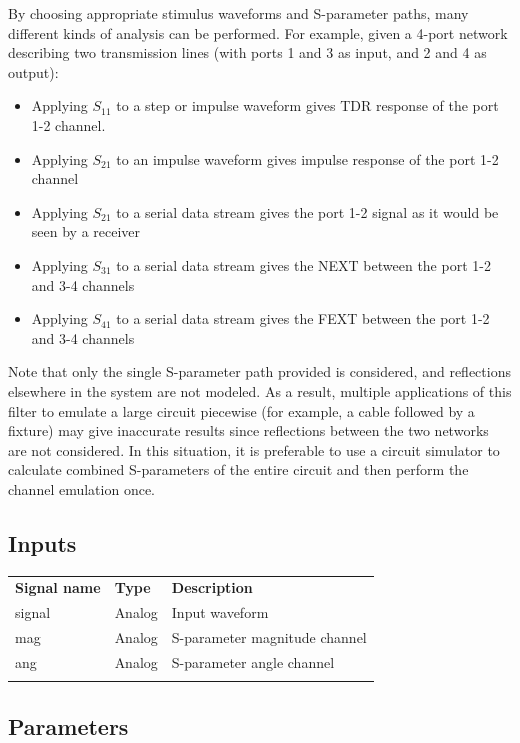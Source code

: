 By choosing appropriate stimulus waveforms and S-parameter paths, many different kinds of analysis can be performed.
For example, given a 4-port network describing two transmission lines (with ports 1 and 3 as input, and 2 and 4 as
output):
\begin{itemize}
\item Applying $S_{11}$ to a step or impulse waveform gives TDR response of the port 1-2 channel.
\item Applying $S_{21}$ to an impulse waveform gives impulse response of the port 1-2 channel
\item Applying $S_{21}$ to a serial data stream gives the port 1-2 signal as it would be seen by a receiver
\item Applying $S_{31}$ to a serial data stream gives the NEXT between the port 1-2 and 3-4 channels
\item Applying $S_{41}$ to a serial data stream gives the FEXT between the port 1-2 and 3-4 channels
\end{itemize}

Note that only the single S-parameter path provided is considered, and reflections elsewhere in the system are not
modeled. As a result, multiple applications of this filter to emulate a large circuit piecewise (for example, a
cable followed by a fixture) may give inaccurate results since reflections between the two networks are not considered.
In this situation, it is preferable to use a circuit simulator to calculate combined S-parameters of the entire circuit
and then perform the channel emulation once.

\subsection{Inputs}

\begin{tabularx}{16cm}{llX}
\thickhline
\textbf{Signal name} & \textbf{Type} & \textbf{Description} \\
\thickhline
signal & Analog & Input waveform \\
\thinhline
mag & Analog & S-parameter magnitude channel \\
\thinhline
ang & Analog & S-parameter angle channel \\
\thickhline
\end{tabularx}

\subsection{Parameters}


